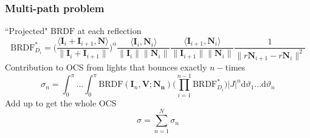 \documentclass{beamer}
\newcommand{\BRDF}{\mathrm{BRDF}}
\newcommand{\ip}[2]{\langle {#1}, {#2} \rangle}
\begin{document}
\begin{frame}[t]
\frametitle{Multi-path problem}
``Projected" $\BRDF$ at each reflection
$$\BRDF^*_{D_i}=\Bigg(\frac{\ip{\mathbf{I}_i+\mathbf{I}_{i+1}}{\mathbf{N}}}{\|\mathbf{I}_i+\mathbf{I}_{i+1}\|}\Bigg)^\alpha\frac{\ip{\mathbf{I}_i}{\mathbf{N}_i}}{\|\mathbf{I}_i\|\|\mathbf{N}_i\|}\frac{\ip{\mathbf{I}_{i+1}}{\mathbf{N}_i}}{\|\mathbf{I}_{i+1}\|\|\mathbf{N}_i\|} \frac{1}{\|r\mathbf{N}_{i+1}-r\mathbf{N}_i\|^2}$$
Contribution to OCS from lights that bounces exactly $n-$times 
\begin{equation*}
\sigma_n =\int_{0}^{\pi}...\int_{0}^{\pi}\BRDF(\mathbf{I}_n,\mathbf{V};\mathbf{N_n})\bigg(\prod_{i=1}^{n-1}\BRDF^*_{D_i}\bigg) |J|^n\mathrm{d}\vartheta_1...\mathrm{d}\vartheta_n 
\end{equation*}
Add up to get the whole OCS
$$\sigma=\sum_{n=1}^{N} \sigma_n$$
\end{frame}
\end{document}
